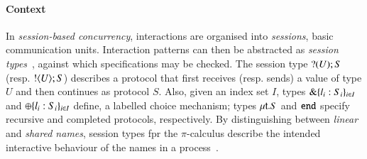 \documentclass[preprint,11pt]{elsarticle}
\begin{document}
\paragraph{Context}
In \emph{session-based concurrency}, interactions are organised into \emph{sessions}, basic communication units.
Interaction patterns can then be abstracted as \emph{session types}~\cite{honda.vasconcelos.kubo:language-primitives}, against which  specifications may be checked. 
The session type $? (U) ; S$ (resp.  $! \langle U \rangle ; S$)
describes a protocol that first receives (resp. sends) a value of type $U$ and then continues as protocol $S$.
Also, given an index set $I$, types $\& \{l_i:S_i\}_{i \in I}$ 
and $\oplus \{l_i:S_i\}_{i \in I}$ 
define, %
 a labelled choice mechanism; types 
$\mu\mathsf{t}.S$ 
and 
$\mathtt{end}$ specify recursive and completed protocols, respectively.
By distinguishing between \emph{linear} and \emph{shared names},
session types fpr the %
$\pi$-calculus describe the intended interactive behaviour of the names %
in a process~\cite{honda.vasconcelos.kubo:language-primitives}.

\end{document}
